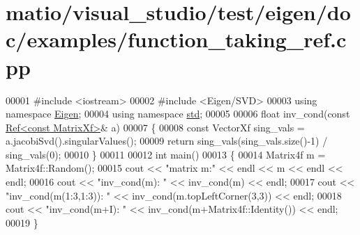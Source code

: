 \hypertarget{matio_2visual__studio_2test_2eigen_2doc_2examples_2function__taking__ref_8cpp_source}{}\section{matio/visual\+\_\+studio/test/eigen/doc/examples/function\+\_\+taking\+\_\+ref.cpp}
\label{matio_2visual__studio_2test_2eigen_2doc_2examples_2function__taking__ref_8cpp_source}

\begin{DoxyCode}
00001 \textcolor{preprocessor}{#include <iostream>}
00002 \textcolor{preprocessor}{#include <Eigen/SVD>}
00003 \textcolor{keyword}{using namespace }\hyperlink{namespace_eigen}{Eigen};
00004 \textcolor{keyword}{using namespace }\hyperlink{namespacestd}{std};
00005 
00006 \textcolor{keywordtype}{float} inv\_cond(\textcolor{keyword}{const} \hyperlink{group___core___module_class_eigen_1_1_ref}{Ref<const MatrixXf>}& a)
00007 \{
00008   \textcolor{keyword}{const} VectorXf sing\_vals = a.jacobiSvd().singularValues();
00009   \textcolor{keywordflow}{return} sing\_vals(sing\_vals.size()-1) / sing\_vals(0);
00010 \}
00011 
00012 \textcolor{keywordtype}{int} main()
00013 \{
00014   Matrix4f m = Matrix4f::Random();
00015   cout << \textcolor{stringliteral}{"matrix m:"} << endl << m << endl << endl;
00016   cout << \textcolor{stringliteral}{"inv\_cond(m):          "} << inv\_cond(m)                      << endl;
00017   cout << \textcolor{stringliteral}{"inv\_cond(m(1:3,1:3)): "} << inv\_cond(m.topLeftCorner(3,3))   << endl;
00018   cout << \textcolor{stringliteral}{"inv\_cond(m+I):        "} << inv\_cond(m+Matrix4f::Identity()) << endl;
00019 \}
\end{DoxyCode}
